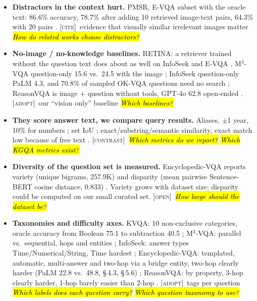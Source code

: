 \documentclass[10pt,a4paper]{article}
\newcommand{\adopt}{\textsc{[adopt]}}
\newcommand{\contrast}{\textsc{[contrast]}}
\newcommand{\cit}{\textsc{[cite]}}
\newcommand{\open}{\textsc{[open]}}
\newcommand{\q}[1]{\hl{\footnotesize\itshape #1}}
\begin{document}
\begin{itemize}
    R@1 from 43.5 to 14.7 / 20.4 (same / other category, Table 2).
    \open\ as a separate difficulty setting, not as index distractors
    \q{How is difficulty defined?} \q{How are distractors chosen?}
  \item \textbf{Distractors in the context hurt.} PMSR, E-VQA subset
    with the oracle text: 86.6\% accuracy, 78.7\% after adding 10
    retrieved image-text pairs, 64.3\% with 20 pairs
    \cite[App.~M, Table A8]{choi2025progressive}. \cit\ evidence that
    visually similar irrelevant images matter \q{How do related works
    choose distractors?}
  \item \textbf{No-image / no-knowledge baselines.} RETINA: a
    retriever trained without the question text does about as well on
    InfoSeek and E-VQA \cite[\S\,1, Fig.~2]{lee2025breaking}.
    M$^3$-VQA question-only 15.6 vs.\ 24.5 with the image \cite[Table
    4]{ma2026m3}; InfoSeek question-only PaLM 4.3, and 70.8\% of
    sampled OK-VQA questions need no search \cite[\S\,2, Table 4]{chen2023can};
    ReasonVQA is image + question without tools, GPT-4o 62.8
    open-ended \cite[Table 2]{tran2025reasonvqa}. \adopt\ our
    ``vision only'' baseline \q{Which baselines?}
  \item \textbf{They score answer text, we compare query results.}
    Aliases, $\pm$1 year, 10\% for numbers
    \cite[App.~A.3]{chen2023can}; set IoU \cite[\S\,4.3]{ma2026m3};
    exact/substring/semantic similarity, exact match low because of
    free text \cite[\S\,4.3]{tran2025reasonvqa}. \contrast\ \q{Which
    metrics do we report?} \q{Which KGQA metrics exist?}
  \item \textbf{Diversity of the question set is measured.}
    Encyclopedic-VQA reports variety (unique bigrams, 257.9K) and
    disparity (mean pairwise Sentence-BERT cosine distance, 0.833)
    \cite[\S\,4.5, Table 3]{mensink2023encyclopedic}. Variety grows
    with dataset size; disparity could be computed on our small
    curated set. \open\ \q{How large should the dataset be?}
  \item \textbf{Taxonomies and difficulty axes.} KVQA: 10
    non-exclusive categories, oracle accuracy from Boolean 75.1 to
    subtraction 40.5 \cite[Fig.~2, Table 5]{shah2019kvqa}; M$^3$-VQA:
    parallel vs.\ sequential, hops and entities \cite[\S\,3]{ma2026m3};
    InfoSeek: answer types Time/Numerical/String, Time hardest
    \cite[Table 6]{chen2023can}; Encyclopedic-VQA: templated,
    automatic, multi-answer and two-hop via a bridge entity, two-hop
    clearly harder (PaLM 22.8 vs.\ 48.8, \S\,4.3, \S\,5.6)
    \cite{mensink2023encyclopedic}; ReasonVQA: by property, 3-hop
    clearly harder, 1-hop barely easier than 2-hop
    \cite[\S\,4.4]{tran2025reasonvqa}. \adopt\ tags per question
    \q{Which labels does each question carry?} \q{Which question
    taxonomy to use?}
\end{itemize}
\end{document}

